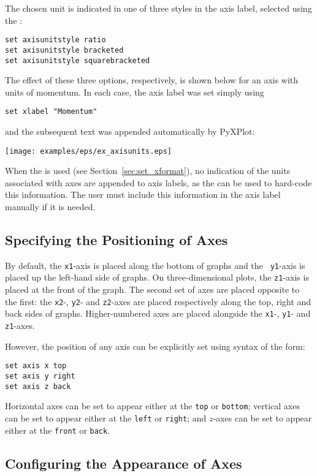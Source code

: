 The chosen unit is indicated in one of three styles in the axis label, selected
using the :
\begin{verbatim}
set axisunitstyle ratio
set axisunitstyle bracketed
set axisunitstyle squarebracketed
\end{verbatim}
The effect of these three options, respectively, is shown below for an axis
with units of momentum. In each case, the axis label was set simply using
\begin{verbatim}
set xlabel "Momentum"
\end{verbatim}
and the subsequent text was appended automatically by PyXPlot:

\vspace{3mm}
\centerline{\texttt{[image: examples/eps/ex\_axisunits.eps]}}
\vspace{3mm}

When the  is used (see Section~\ref{sec:set_xformat}), no
indication of the units associated with axes are appended to axis labels, as
the  can be used to hard-code this information. The user
must include this information in the axis label manually if it is needed.

\subsection{Specifying the Positioning of Axes}

By default, the {\tt x1}-axis is placed along the bottom of graphs and the {\tt
y1}-axis is placed up the left-hand side of graphs. On three-dimensional plots,
the {\tt z1}-axis is placed at the front of the graph. The second set of axes
are placed opposite to the first: the {\tt x2}-, {\tt y2}- and {\tt z2}-axes
are placed respectively along the top, right and back sides of graphs.
Higher-numbered axes are placed alongside the {\tt x1}-, {\tt y1}- and {\tt
z1}-axes.

However, the position of any axis can be explicitly set using syntax of the
form:
\begin{verbatim}
set axis x top
set axis y right
set axis z back
\end{verbatim}
Horizontal axes can be set to appear either at the {\tt top} or {\tt bottom};
vertical axes can be set to appear either at the {\tt left} or {\tt right}; and
$z$-axes can be set to appear either at the {\tt front} or {\tt back}.

\subsection{Configuring the Appearance of Axes}

